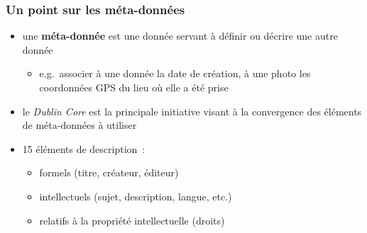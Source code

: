 \begin{frame}
\frametitle{Un point sur les méta-données}

\begin{itemize} \itemsep0.8em
    \item une \textbf{méta-donnée} est une donnée servant à définir ou décrire 
          une autre donnée
    \begin{itemize}
        \item e.g.~associer à une donnée la date de création, à une photo les 
              coordonnées GPS du lieu où elle a été prise
    \end{itemize}
    \item le \textit{Dublin Core} est la principale initiative visant à la 
          convergence des éléments de méta-données à utiliser
    \item 15 éléments de description~:
    \begin{itemize}
        \item formels (titre, créateur, éditeur)
        \item intellectuels (sujet, description, langue, etc.)
        \item relatifs à la propriété intellectuelle (droits)
    \end{itemize}
\end{itemize}

\end{frame}


